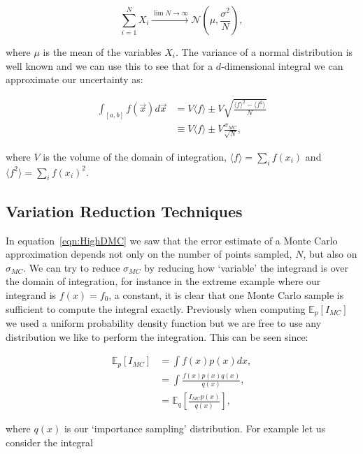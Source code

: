 	\begin{equation}
		\sum_{i=1}^{N}X_i\xrightarrow{\lim{N\rightarrow\infty}}\mathcal{N}\left(\mu, \frac{\sigma^2}{N}\right),
	\end{equation}

	\noindent where $\mu$ is the mean of the variables $X_i$.  The variance of a normal distribution is well known and we can use this to see that
	for a $d$-dimensional integral we can approximate our uncertainty as:

	\begin{align}
		\int_{[a, b]}f(\vec{x})d\vec{x} &= V\langle f\rangle \pm V\sqrt{\frac{\langle f\rangle^2 - \langle f^2\rangle}{N}}\\
		                                &\equiv V\langle f\rangle \pm V\frac{\sigma_{MC}}{\sqrt{N}},
		\label{eqn:HighDMC}
	\end{align}

	\noindent where $V$ is the volume of the domain of integration, $\langle f\rangle=\sum_i f(x_i)$ and $\langle f^2\rangle=\sum_i f(x_i)^2$.

	\subsection{Variation Reduction Techniques}
	\label{sub:VarReduction}

	In equation~\ref{eqn:HighDMC} we saw that the error estimate of a Monte Carlo approximation depends not only on the number of points sampled,
	$N$, but also on $\sigma_{MC}$.  We can try to reduce $\sigma_{MC}$ by reducing how `variable' the integrand is over the domain of integration, for instance in the extreme
	example where our integrand is $f(x)=f_0$, a constant, it is clear that one Monte Carlo sample is sufficient to compute the integral exactly.
	Previously when computing $\mathbb{E}_p[I_{MC}]$ we used a uniform probability density function but we are free to use any distribution we like
	to perform the integration.  This can be seen since:

	\begin{align*}
		\mathbb{E}_p[I_{MC}] &= \int f(x)p(x)dx, \\
		                     &= \int\frac{f(x)p(x)q(x)}{q(x)}, \\
		                     &= \mathbb{E}_q\left[\frac{I_{MC}p(x)}{q(x)}\right],
	\end{align*}

	\noindent where $q(x)$ is our `importance sampling' distribution.  For example let us consider the integral

